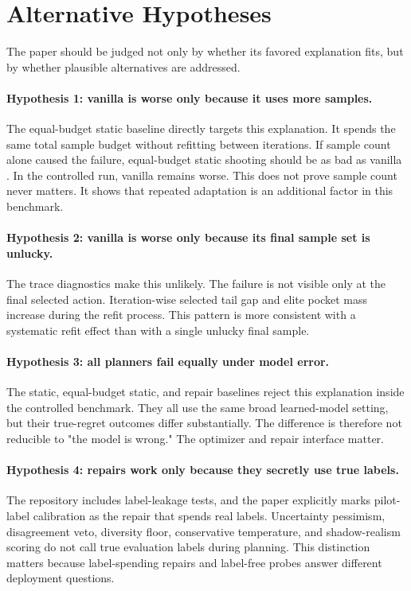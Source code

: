 \section{Alternative Hypotheses}
\label{app:alternative-hypotheses}

The paper should be judged not only by whether its favored explanation fits,
but by whether plausible alternatives are addressed.

\paragraph{Hypothesis 1: vanilla \cem{} is worse only because it uses more
samples.}
The equal-budget static baseline directly targets this explanation. It spends
the same total sample budget without refitting between iterations. If sample
count alone caused the failure, equal-budget static shooting should be as bad
as vanilla \cem{}. In the controlled run, vanilla \cem{} remains worse. This
does not prove sample count never matters. It shows that repeated adaptation is
an additional factor in this benchmark.

\paragraph{Hypothesis 2: vanilla \cem{} is worse only because its final sample
set is unlucky.}
The trace diagnostics make this unlikely. The failure is not visible only at
the final selected action. Iteration-wise selected tail gap and elite pocket
mass increase during the refit process. This pattern is more consistent with a
systematic refit effect than with a single unlucky final sample.

\paragraph{Hypothesis 3: all planners fail equally under model error.}
The static, equal-budget static, and repair baselines reject this explanation
inside the controlled benchmark. They all use the same broad learned-model
setting, but their true-regret outcomes differ substantially. The difference
is therefore not reducible to "the model is wrong." The optimizer and repair
interface matter.

\paragraph{Hypothesis 4: repairs work only because they secretly use true
labels.}
The repository includes label-leakage tests, and the paper explicitly marks
pilot-label calibration as the repair that spends real labels. Uncertainty
pessimism, disagreement veto, diversity floor, conservative temperature, and
shadow-realism scoring do not call true evaluation labels during planning.
This distinction matters because label-spending repairs and label-free probes
answer different deployment questions.

